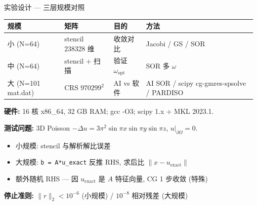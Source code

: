 \documentclass[12pt,aspectratio=169]{beamer}
\begin{document}
\begin{frame}[shrink]{实验设计 — 三层规模对照}

\footnotesize
\begin{center}
\renewcommand{\arraystretch}{1.1}
\setlength{\tabcolsep}{3pt}
\begin{tabular}{@{}l p{2.8cm} p{2.6cm} p{4.8cm}@{}}
\toprule
\textbf{规模} & \textbf{矩阵} & \textbf{目的} & \textbf{方法} \\
\midrule
小 (N=64)        & stencil 238328 维   & 收敛对比      & Jacobi / GS / SOR \\
中 (N=64)        & stencil + 扫描      & 验证 $\omega_{\text{opt}}$ & SOR 多 $\omega$ \\
大 (N=101 mat.dat) & CRS $970299^2$    & AI vs 软件   & AI SOR / scipy cg-gmres-spsolve / PARDISO \\
\bottomrule
\end{tabular}
\end{center}
\normalsize

\vspace{4pt}
\small \textbf{硬件:} 16 核 x86\_64, 32 GB RAM; gcc -O3; scipy 1.x + MKL 2023.1.

\textbf{测试问题:} 3D Poisson $-\Delta u = 3\pi^2 \sin\pi x\sin\pi y\sin\pi z$, $u|_{\partial\Omega}=0$.
\begin{itemize}\itemsep0pt
  \item 小规模: stencil 与解析解比误差
  \item 大规模: \texttt{b = A*u\_exact} 反推 RHS, 求后比 $\|x-u_{\text{exact}}\|$
  \item 额外随机 RHS — 因 $u_{\text{exact}}$ 是 $A$ 特征向量, CG 1 步收敛 (特殊)
\end{itemize}

\vspace{2pt}
\begin{center}
\small \textbf{停止准则:} $\|r\|_2 < 10^{-6}$ (小规模) / $10^{-8}$ 相对残差 (大规模)
\end{center}
\end{frame}
\end{document}
